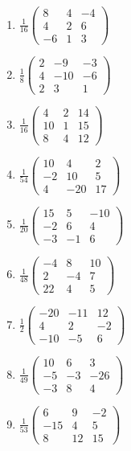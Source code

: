 \begin{enumerate}[label=\arabic*., leftmargin=*, itemsep=1pt]
\item $\frac{1}{16}\left(\begin{smallmatrix}8 & 4 & -4\\ 4 & 2 & 6\\ -6 & 1 & 3\end{smallmatrix}\right)$
\item $\frac{1}{8}\left(\begin{smallmatrix}2 & -9 & -3\\ 4 & -10 & -6\\ 2 & 3 & 1\end{smallmatrix}\right)$
\item $\frac{1}{16}\left(\begin{smallmatrix}4 & 2 & 14\\ 10 & 1 & 15\\ 8 & 4 & 12\end{smallmatrix}\right)$
\item $\frac{1}{54}\left(\begin{smallmatrix}10 & 4 & 2\\ -2 & 10 & 5\\ 4 & -20 & 17\end{smallmatrix}\right)$
\item $\frac{1}{20}\left(\begin{smallmatrix}15 & 5 & -10\\ -2 & 6 & 4\\ -3 & -1 & 6\end{smallmatrix}\right)$
\item $\frac{1}{48}\left(\begin{smallmatrix}-4 & 8 & 10\\ 2 & -4 & 7\\ 22 & 4 & 5\end{smallmatrix}\right)$
\item $\frac{1}{2}\left(\begin{smallmatrix}-20 & -11 & 12\\ 4 & 2 & -2\\ -10 & -5 & 6\end{smallmatrix}\right)$
\item $\frac{1}{49}\left(\begin{smallmatrix}10 & 6 & 3\\ -5 & -3 & -26\\ -3 & 8 & 4\end{smallmatrix}\right)$
\item $\frac{1}{53}\left(\begin{smallmatrix}6 & 9 & -2\\ -15 & 4 & 5\\ 8 & 12 & 15\end{smallmatrix}\right)$

\end{enumerate}
